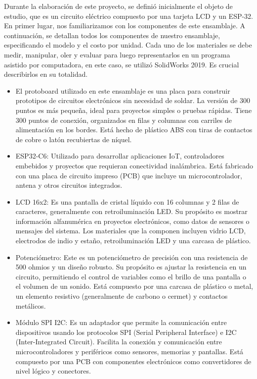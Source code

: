     Durante la elaboración de este proyecto, se definió inicialmente el objeto de estudio, que es un circuito eléctrico compuesto por una tarjeta LCD y un ESP-32. En primer lugar, nos familiarizamos con los componentes de este ensamblaje. A continuación, se detallan todos los componentes de nuestro ensamblaje, especificando el modelo y el costo por unidad. Cada uno de los materiales se debe medir, manipular, oler y evaluar para luego representarlos en un programa asistido por computadora, en este caso, se utilizó SolidWorks 2019. Es crucial describirlos en su totalidad.
    \begin{itemize}
    \item El protoboard utilizado en este ensamblaje es una placa para construir prototipos de circuitos electrónicos sin necesidad de soldar. La versión de 300 puntos es más pequeña, ideal para proyectos simples o pruebas rápidas. Tiene 300 puntos de conexión, organizados en filas y columnas con carriles de alimentación en los bordes. Está hecho de plástico ABS con tiras de contactos de cobre o latón recubiertas de níquel.
    \item ESP32-C6: Utilizado para desarrollar aplicaciones IoT, controladores embebidos y proyectos que requieran conectividad inalámbrica. Está fabricado con una placa de circuito impreso (PCB) que incluye un microcontrolador, antena y otros circuitos integrados.
    \item LCD 16x2: Es una pantalla de cristal líquido con 16 columnas y 2 filas de caracteres, generalmente con retroiluminación LED. Su propósito es mostrar información alfanumérica en proyectos electrónicos, como datos de sensores o mensajes del sistema. Los materiales que la componen incluyen vidrio LCD, electrodos de indio y estaño, retroiluminación LED y una carcasa de plástico.
    
    \item Potenciómetro: Este es un potenciómetro de precisión con una resistencia de 500 ohmios y un diseño robusto. Su propósito es ajustar la resistencia en un circuito, permitiendo el control de variables como el brillo de una pantalla o el volumen de un sonido. Está compuesto por una carcasa de plástico o metal, un elemento resistivo (generalmente de carbono o cermet) y contactos metálicos.
    
    \item Módulo SPI I2C: Es un adaptador que permite la comunicación entre dispositivos usando los protocolos SPI (Serial Peripheral Interface) e I2C (Inter-Integrated Circuit). Facilita la conexión y comunicación entre microcontroladores y periféricos como sensores, memorias y pantallas. Está compuesto por una PCB con componentes electrónicos como convertidores de nivel lógico y conectores.
    

\end{itemize}
